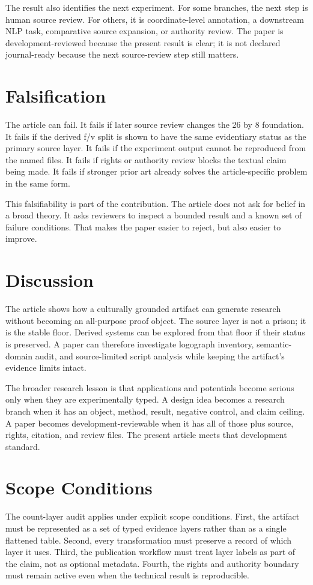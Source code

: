 \documentclass[sigconf,nonacm]{acmart}
\begin{document}
The result also identifies the next experiment. For some branches, the next step
is human source review. For others, it is coordinate-level annotation, a
downstream NLP task, comparative source expansion, or authority review. The
paper is development-reviewed because the present result is clear; it is not
declared journal-ready because the next source-review step still matters.

\section{Falsification}
The article can fail. It fails if later source review changes the 26 by 8
foundation. It fails if the derived f/v split is shown to have the same
evidentiary status as the primary source layer. It fails if the experiment output
cannot be reproduced from the named files. It fails if rights or authority review
blocks the textual claim being made. It fails if stronger prior art already
solves the article-specific problem in the same form.

This falsifiability is part of the contribution. The article does not ask for
belief in a broad theory. It asks reviewers to inspect a bounded result and a
known set of failure conditions. That makes the paper easier to reject, but also
easier to improve.

\section{Discussion}
The article shows how a culturally grounded artifact can generate research
without becoming an all-purpose proof object. The source layer is not a prison;
it is the stable floor. Derived systems can be explored from that floor if their
status is preserved. A paper can therefore investigate logograph inventory, semantic-domain audit, and source-limited script analysis while keeping the
artifact's evidence limits intact.

The broader research lesson is that applications and potentials become serious
only when they are experimentally typed. A design idea becomes a research branch
when it has an object, method, result, negative control, and claim ceiling. A
paper becomes development-reviewable when it has all of those plus source,
rights, citation, and review files. The present article meets that development
standard.


\section{Scope Conditions}
The count-layer audit applies under explicit scope conditions. First, the artifact must be
represented as a set of typed evidence layers rather than as a single flattened
table. Second, every transformation must preserve a record of which layer it
uses. Third, the publication workflow must treat layer labels as part of the
claim, not as optional metadata. Fourth, the rights and authority boundary must
remain active even when the technical result is reproducible.
\end{document}
